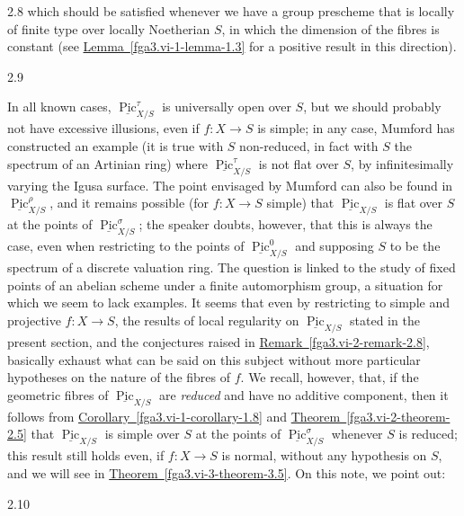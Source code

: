 \begin{remark}{2.8}
    which should be satisfied whenever we have a group prescheme that is locally of finite type over locally Noetherian \(S\), in which the dimension of the fibres is constant (see \hyperref[fga3.vi-1-lemma-1.3]{Lemma~\ref*{fga3.vi-1-lemma-1.3}} for a positive result in this direction).\end{remark}\begin{remark}{2.9}\label{fga3.vi-2-remark-2.9}\skipsinglepar\par{}In all known cases, \(\underline {\operatorname {Pic}}_{X/S}^\tau \) is universally open over \(S\), but we should probably not have excessive illusions, even if \(f\colon  X\to  S\) is simple;
    in any case, Mumford has constructed an example (it is true with \(S\) non-reduced, in fact with \(S\) the spectrum of an Artinian ring) where \(\underline {\operatorname {Pic}}_{X/S}^\tau \) is not flat over \(S\), by infinitesimally varying the Igusa surface.
    The point envisaged by Mumford can also be found in \(\underline {\operatorname {Pic}}_{X/S}^\rho \), and it remains possible (for \(f\colon  X\to  S\) simple) that \(\underline {\operatorname {Pic}}_{X/S}\) is flat over \(S\) at the points of \(\underline {\operatorname {Pic}}_{X/S}^\sigma \);
    the speaker doubts, however, that this is always the case, even when restricting to the points of \(\underline {\operatorname {Pic}}_{X/S}^0\) and supposing \(S\) to be the spectrum of a discrete valuation ring.
    The question is linked to the study of fixed points of an abelian scheme under a finite automorphism group, a situation for which we seem to lack examples.
    It seems that even by restricting to simple and projective \(f\colon  X\to  S\), the results of local regularity on \(\underline {\operatorname {Pic}}_{X/S}\) stated in the present section, and the conjectures raised in \hyperref[fga3.vi-2-remark-2.8]{Remark~\ref*{fga3.vi-2-remark-2.8}}, basically exhaust what can be said on this subject without more particular hypotheses on the nature of the fibres of \(f\).
    We recall, however, that, if the geometric fibres of \(\underline {\operatorname {Pic}}_{X/S}\) are \emph{reduced} and have no additive component, then it follows from \hyperref[fga3.vi-1-corollary-1.8]{Corollary~\ref*{fga3.vi-1-corollary-1.8}} and \hyperref[fga3.vi-2-theorem-2.5]{Theorem~\ref*{fga3.vi-2-theorem-2.5}} that \(\underline {\operatorname {Pic}}_{X/S}\) is simple over \(S\) at the points of \(\underline {\operatorname {Pic}}_{X/S}^\sigma \) whenever \(S\) is reduced;
    this result still holds even, if \(f\colon  X\to  S\) is normal, without any hypothesis on \(S\), and we will see in \hyperref[fga3.vi-3-theorem-3.5]{Theorem~\ref*{fga3.vi-3-theorem-3.5}}.
    On this note, we point out:\end{remark}\begin{proposition}{2.10}\label{fga3.vi-2-proposition-2.10}\skipsinglepar\begin{enumerate}
    

\end{enumerate}
\end{proposition}
